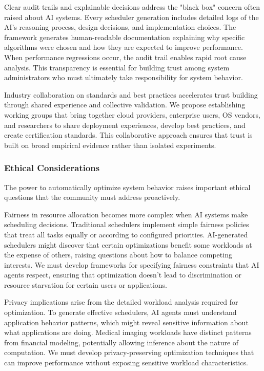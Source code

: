Clear audit trails and explainable decisions address the "black box" concern often raised about AI systems. Every scheduler generation includes detailed logs of the AI's reasoning process, design decisions, and implementation choices. The framework generates human-readable documentation explaining why specific algorithms were chosen and how they are expected to improve performance. When performance regressions occur, the audit trail enables rapid root cause analysis. This transparency is essential for building trust among system administrators who must ultimately take responsibility for system behavior.

Industry collaboration on standards and best practices accelerates trust building through shared experience and collective validation. We propose establishing working groups that bring together cloud providers, enterprise users, OS vendors, and researchers to share deployment experiences, develop best practices, and create certification standards. This collaborative approach ensures that trust is built on broad empirical evidence rather than isolated experiments.

\subsubsection{Ethical Considerations}
The power to automatically optimize system behavior raises important ethical questions that the community must address proactively.

Fairness in resource allocation becomes more complex when AI systems make scheduling decisions. Traditional schedulers implement simple fairness policies that treat all tasks equally or according to configured priorities. AI-generated schedulers might discover that certain optimizations benefit some workloads at the expense of others, raising questions about how to balance competing interests. We must develop frameworks for specifying fairness constraints that AI agents respect, ensuring that optimization doesn't lead to discrimination or resource starvation for certain users or applications.

Privacy implications arise from the detailed workload analysis required for optimization. To generate effective schedulers, AI agents must understand application behavior patterns, which might reveal sensitive information about what applications are doing. Medical imaging workloads have distinct patterns from financial modeling, potentially allowing inference about the nature of computation. We must develop privacy-preserving optimization techniques that can improve performance without exposing sensitive workload characteristics.

